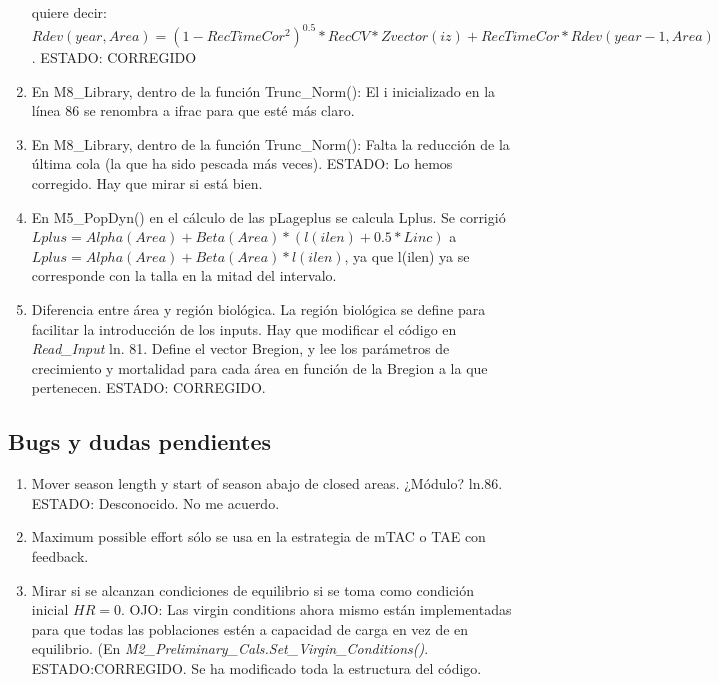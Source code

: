\documentclass[12pt, oneside, a4paper]{article}
\begin{document}
\begin{enumerate}
                quiere decir: $Rdev(year, Area) = (1 - RecTimeCor ^ 2) ^ {0.5} * RecCV * Zvector(iz) + RecTimeCor * Rdev(year - 1, Area)$. ESTADO: CORREGIDO
 				\item En M8\_Library, dentro de la función Trunc\_Norm(): El i inicializado en la línea 86 se renombra a ifrac para que esté más claro.
				\item En M8\_Library, dentro de la función Trunc\_Norm(): Falta la reducción de la última cola (la que ha sido pescada más veces). ESTADO: Lo hemos corregido. Hay que mirar si está bien.  
				\item En M5\_PopDyn() en el cálculo de las pLageplus se calcula Lplus. Se corrigió $Lplus = Alpha(Area) + Beta(Area) * (l(ilen)+0.5* Linc)$ a $Lplus = Alpha(Area) + Beta(Area) * l(ilen)$, ya que l(ilen) ya se corresponde con la talla en la mitad del intervalo. 
				\item Diferencia entre área y región biológica. La región biológica se define para facilitar la introducción de los inputs. Hay que modificar el código en \emph{Read\_Input} ln. 81. Define el vector Bregion, y lee los parámetros de crecimiento y mortalidad para cada área en función de la Bregion a la que pertenecen. ESTADO: CORREGIDO. 
	               
			\end{enumerate}
	
		\subsection{Bugs y dudas pendientes}
			\begin{enumerate}

				\item Mover season length y start of season abajo de closed areas. ¿Módulo? ln.86. ESTADO: Desconocido. No me acuerdo.
				\item Maximum possible effort sólo se usa en la estrategia de mTAC o TAE con feedback. 
				\item Mirar si se alcanzan condiciones de equilibrio si se toma como condición inicial $HR=0$. OJO: Las virgin conditions ahora mismo están implementadas para que todas las poblaciones estén a capacidad de carga en vez de en equilibrio. (En \emph{M2\_Preliminary\_Cals.Set\_Virgin\_Conditions()}. ESTADO:CORREGIDO. Se ha modificado toda la estructura del código. 
			\end{enumerate}
		
			
\end{document}
